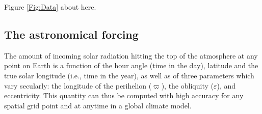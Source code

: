 \documentclass[a4paper,12pt]{article}
\newcommand{\spp}[1]{\par\medskip\noindent\fbox{\parbox{\textwidth}{\textbf{Comment by SPP}: #1 }}\medskip}
\begin{document}
\begin{center}
\begin{LARGE}
Figure \ref{Fig:Data} about here.
\end{LARGE}
\end{center}


%
%


\color{black}

\subsection{The astronomical forcing}

The amount of incoming solar radiation hitting the top of the atmosphere at any point on Earth 
is a function of the hour angle (time in the day), latitude and the true solar longitude (i.e., time in the year), 
as well as of three parameters which vary secularly: the longitude of the perihelion ($\varpi$), 
the obliquity ($\varepsilon$), and eccentricity. 
This quantity can thus be computed with high accuracy for any spatial grid point and at anytime in  a global climate model. 
\end{document}
